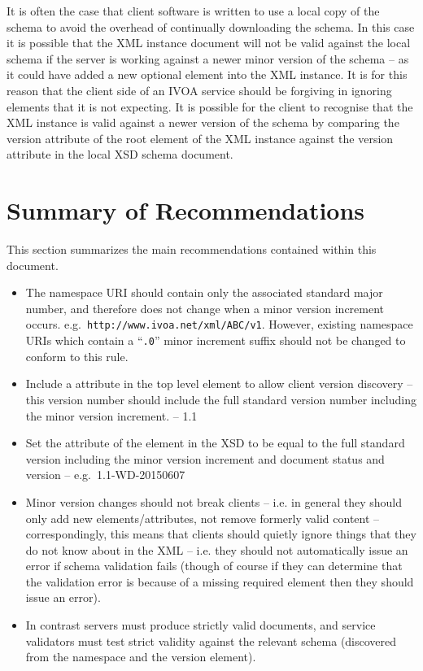 \documentclass[10pt,a4paper]{ivoa}
\begin{document}
It is often the case that client software is written to use a local copy of the
schema to avoid the overhead of continually downloading the schema. In this case
it is possible that the XML instance document will not be valid against the
local schema if the server is working against a newer minor version of the
schema -- as it could have added a new optional element into the XML instance.
It is for this reason that the client side of an IVOA service should be
forgiving in ignoring elements that it is not expecting. It is possible for the
client to recognise that the XML instance is valid against a newer version of
the schema by comparing the version attribute of the root element of the XML
instance against the version attribute in the local XSD schema document.

\section{Summary of Recommendations}
This section summarizes the main recommendations contained within this document.

\begin{itemize}
\item The namespace URI should contain only the associated standard major number, 
and therefore does not change when a minor version increment occurs.
e.g.\ \texttt{http://www.ivoa.net/xml/ABC/v1}. However, existing namespace URIs
which contain a ``\texttt{.0}'' minor increment suffix should not be changed to
conform to this rule.

\item Include a  attribute in the top level element to allow
client version discovery -- this version number should include the full standard version
number including the minor version increment. -- 1.1

\item Set the  attribute of the  element in the
XSD to be equal to the full standard version including the minor version
increment and document status and version -- e.g.\ 1.1-WD-20150607

\item Minor version changes should not break clients -- i.e. in general they
should only add new elements/attributes, not remove formerly valid
content --
correspondingly, this means that clients should quietly ignore things that they
do not know about in the XML -- i.e. they should not automatically issue an error
if schema validation fails (though of course if they can determine that the
validation error is because of a missing required element then they should
issue an error).
\item In contrast servers must produce strictly valid documents, and service
validators must test strict validity against the relevant schema (discovered
from the namespace and the version element).
\end{itemize}
\end{document}
